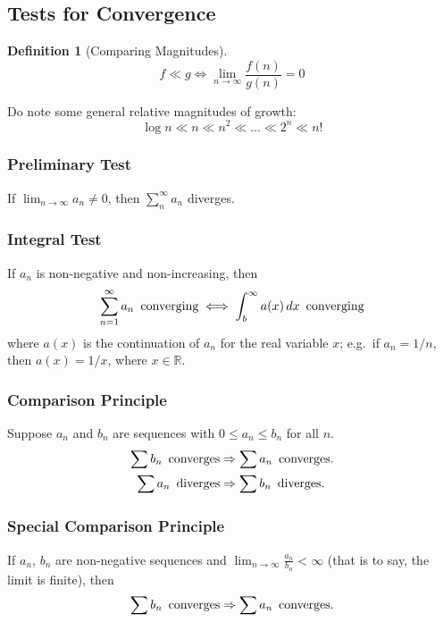 \documentclass[10pt]{scrartcl}
\numberwithin{equation}{subsection}
\theoremstyle{definition}
\newtheorem{definition}{Definition}[section]
\theoremstyle{remark}
\newenvironment{definitionSR}
{
\begin{siderules}
\begin{definition}
}
{
\end{definition}
\end{siderules}
}
\begin{document}
\subsection{Tests for Convergence}

\begin{definitionSR}[Comparing Magnitudes]
\[
 f \ll g \iff \lim_{n \to \infty } \frac{f(n)}{g(n)} = 0
\]
\end{definitionSR}

Do note some general relative magnitudes of growth:
\begin{equation}
\log n \ll n \ll n^2 \ll \ldots \ll 2^n \ll n!
\end{equation}

\subsubsection{Preliminary Test}
If $\lim_{n \to \infty} a_n \neq 0$, then $\sum_n^\infty a_n$ diverges.

\subsubsection{Integral Test}
If $a_n$ is non-negative and non-increasing, then
\[
	\sum_{n=1}^\infty a_n \text{\, converging} \iff \int_b^\infty a(x)\,dx \text{\, converging}
\]
where $a(x)$ is the continuation of $a_n$ for the real variable $x$; e.g.\ if $a_n = 1/n$, then $a(x) = 1/x$, where $x \in \mathbb{R}$.
\subsubsection{Comparison Principle}
Suppose $a_n$ and $b_n$ are sequences with $0 \leq a_n \leq b_n$ for all $n$.
\begin{align*}
\sum b_n \text{\, converges}  &\Rightarrow \sum a_n \text{\, converges.} \\
\sum a_n \text{\, diverges}  &\Rightarrow \sum b_n \text{\, diverges.}
\end{align*}

\subsubsection{Special Comparison Principle}
If $a_n$, $b_n$ are non-negative sequences and $\lim_{n \to \infty} \frac{a_n}{b_n} < \infty$ (that is to say, the limit is finite), then
\[
\sum b_n \text{\, converges}  \Rightarrow \sum a_n \text{\, converges.} 
\]
\end{document}
